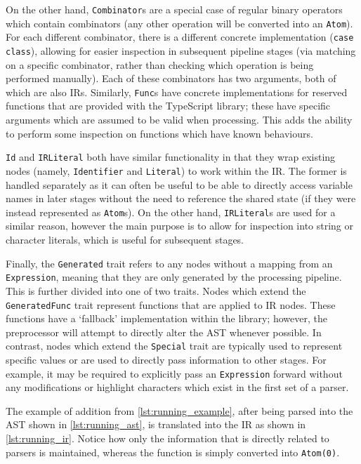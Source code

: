 On the other hand, \texttt{Combinator}s are a special case of regular binary operators which contain combinators (any other operation will be converted into an \texttt{Atom}).
For each different combinator, there is a different concrete implementation (\texttt{case class}), allowing for easier inspection in subsequent pipeline stages (via matching on a specific combinator, rather than checking which operation is being performed manually).
Each of these combinators has two arguments, both of which are also IRs.
Similarly, \texttt{Func}s have concrete implementations for reserved functions that are provided with the TypeScript library; these have specific arguments which are assumed to be valid when processing.
This adds the ability to perform some inspection on functions which have known behaviours.

\texttt{Id} and \texttt{IRLiteral} both have similar functionality in that they wrap existing nodes (namely, \texttt{Identifier} and \texttt{Literal}) to work within the IR.
The former is handled separately as it can often be useful to be able to directly access variable names in later stages without the need to reference the shared state (if they were instead represented as \texttt{Atom}s).
On the other hand, \texttt{IRLiteral}s are used for a similar reason, however the main purpose is to allow for inspection into string or character literals, which is useful for subsequent stages.

Finally, the \texttt{Generated} trait refers to any nodes without a mapping from an \texttt{Expression}, meaning that they are only generated by the processing pipeline.
This is further divided into one of two traits.
Nodes which extend the \texttt{GeneratedFunc} trait represent functions that are applied to IR nodes.
These functions have a `fallback' implementation within the library; however, the preprocessor will attempt to directly alter the AST whenever possible.
In contrast, nodes which extend the \texttt{Special} trait are typically used to represent specific values or are used to directly pass information to other stages.
For example, it may be required to explicitly pass an \texttt{Expression} forward without any modifications or highlight characters which exist in the first set of a parser.
\bigskip

The example of addition from \autoref{lst:running_example}, after being parsed into the AST shown in \autoref{lst:running_ast}, is translated into the IR as shown in \autoref{lst:running_ir}.
Notice how only the information that is directly related to parsers is maintained, whereas the function is simply converted into \texttt{Atom(0)}.

